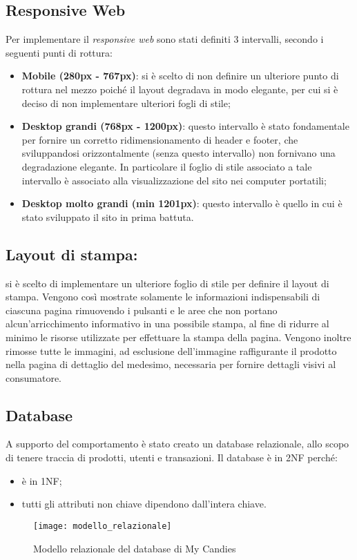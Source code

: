 \subsection{Responsive Web}
Per implementare il \textit{responsive web} sono stati definiti 3 intervalli, secondo i seguenti punti di rottura:
\begin{itemize}
    \item \textbf{Mobile (280px - 767px)}: si è scelto di non definire un ulteriore punto di rottura nel mezzo poiché  il layout degradava in modo elegante, per cui si è deciso di non implementare ulteriori fogli di stile;
    \item \textbf{Desktop grandi (768px - 1200px)}: questo intervallo è stato fondamentale per fornire un corretto ridimensionamento di header e footer, che sviluppandosi orizzontalmente (senza questo intervallo) non fornivano una degradazione elegante. In particolare il foglio di stile associato a tale intervallo è associato alla visualizzazione del sito nei computer portatili;
    \item \textbf{Desktop molto grandi (min 1201px)}: questo intervallo è quello in cui è stato sviluppato il sito in prima battuta. 
\end{itemize}

\subsection{Layout di stampa:} si è scelto di implementare un ulteriore foglio di stile per definire il layout di stampa. Vengono così mostrate solamente le informazioni indispensabili di ciascuna pagina rimuovendo i pulsanti e le aree che non portano alcun'arricchimento informativo in una possibile stampa, al fine di ridurre al minimo le risorse utilizzate per effettuare la stampa della pagina. Vengono inoltre rimosse tutte le immagini, ad esclusione dell'immagine raffigurante il prodotto nella pagina di dettaglio del medesimo, necessaria per fornire dettagli visivi al consumatore.

\subsection{Database}
A supporto del comportamento è stato creato un database relazionale, allo scopo di tenere traccia di prodotti, utenti e transazioni. Il database è in 2NF perché:
\begin{itemize}
    \item è in 1NF;
    \item tutti gli attributi non chiave dipendono dall'intera chiave.
\end{itemize}
\begin{figure}[H]
\centering
\texttt{[image: modello\_relazionale]}
\caption{Modello relazionale del database di My Candies} 
\end{figure}

